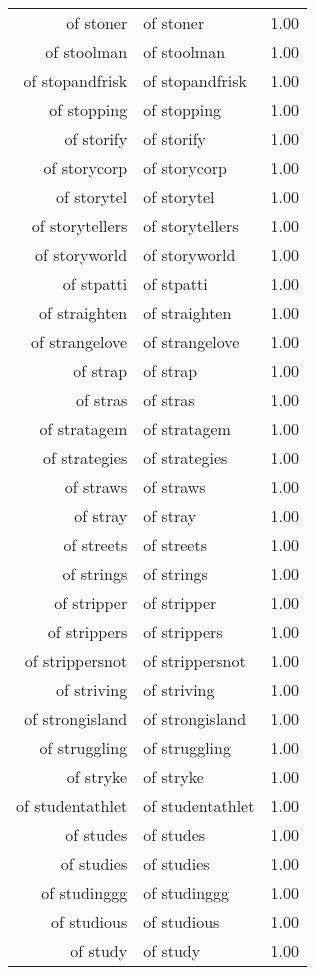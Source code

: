 \begin{table}[ht]
\begin{tabular}{rlr}
  of stoner & of stoner & 1.00 \\ 
  of stoolman & of stoolman & 1.00 \\ 
  of stopandfrisk & of stopandfrisk & 1.00 \\ 
  of stopping & of stopping & 1.00 \\ 
  of storify & of storify & 1.00 \\ 
  of storycorp & of storycorp & 1.00 \\ 
  of storytel & of storytel & 1.00 \\ 
  of storytellers & of storytellers & 1.00 \\ 
  of storyworld & of storyworld & 1.00 \\ 
  of stpatti & of stpatti & 1.00 \\ 
  of straighten & of straighten & 1.00 \\ 
  of strangelove & of strangelove & 1.00 \\ 
  of strap & of strap & 1.00 \\ 
  of stras & of stras & 1.00 \\ 
  of stratagem & of stratagem & 1.00 \\ 
  of strategies & of strategies & 1.00 \\ 
  of straws & of straws & 1.00 \\ 
  of stray & of stray & 1.00 \\ 
  of streets & of streets & 1.00 \\ 
  of strings & of strings & 1.00 \\ 
  of stripper & of stripper & 1.00 \\ 
  of strippers & of strippers & 1.00 \\ 
  of strippersnot & of strippersnot & 1.00 \\ 
  of striving & of striving & 1.00 \\ 
  of strongisland & of strongisland & 1.00 \\ 
  of struggling & of struggling & 1.00 \\ 
  of stryke & of stryke & 1.00 \\ 
  of studentathlet & of studentathlet & 1.00 \\ 
  of studes & of studes & 1.00 \\ 
  of studies & of studies & 1.00 \\ 
  of studinggg & of studinggg & 1.00 \\ 
  of studious & of studious & 1.00 \\ 
  of study & of study & 1.00 \\ 

\end{tabular}
\end{table}
